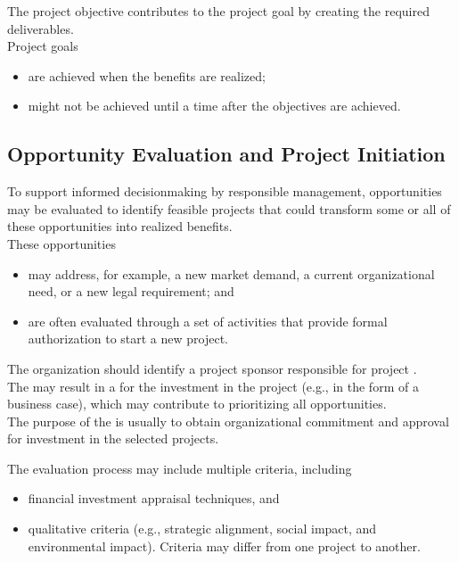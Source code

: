 \documentclass[letterpaper,10pt,english]{jupyterBook}
\begin{document}
\sphinxAtStartPar
The project objective contributes to the project goal by creating the required deliverables. \\
Project goals
\begin{itemize}
\item {} 
\sphinxAtStartPar
are achieved when the benefits are realized;

\item {} 
\sphinxAtStartPar
might not be achieved until a time after the objectives are achieved.

\end{itemize}


\subsection{Opportunity Evaluation and Project Initiation}
\label{\detokenize{PM/pm-concepts:opportunity-evaluation-and-project-initiation}}
\sphinxAtStartPar
To support informed decision\sphinxhyphen{}making by responsible management, opportunities may be evaluated to identify feasible projects that could transform some or all of these opportunities into realized benefits. \\
These opportunities
\begin{itemize}
\item {} 
\sphinxAtStartPar
may address, for example, a new market demand, a current organizational need, or a new legal requirement; and

\item {} 
\sphinxAtStartPar
are often evaluated through a set of activities that provide formal authorization to start a new project.

\end{itemize}

\sphinxAtStartPar
The organization should identify a project sponsor responsible for project . \\
The  may result in a  for the investment in the project (e.g., in the form of a business case), which may contribute to prioritizing all opportunities. \\
The purpose of the  is usually to obtain organizational commitment and approval for investment in the selected projects.

\sphinxAtStartPar
The evaluation process may include multiple criteria, including
\begin{itemize}
\item {} 
\sphinxAtStartPar
financial investment appraisal techniques, and

\item {} 
\sphinxAtStartPar
qualitative criteria (e.g., strategic alignment, social impact, and environmental impact).
Criteria may differ from one project to another.

\end{itemize}
\end{document}

